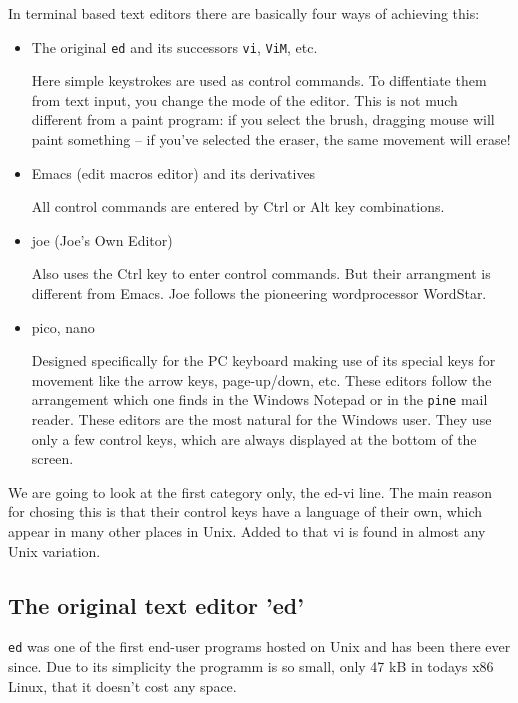 \documentclass[11pt,a4paper,twoside]{article}
\begin{document}
In terminal based text editors there are basically four ways of 
achieving this:

\begin{itemize}
\item The original \texttt{ed} and its successors \texttt{vi}, \texttt{ViM},
etc.

Here simple keystrokes are used as control commands. To diffentiate
them from text input, you change the mode of the editor. This is not
much different from a paint program: if you select the brush, dragging
mouse will paint something -- if you've selected the eraser, the same
movement will erase!

\item Emacs (edit macros editor) and its derivatives

All control commands are entered by Ctrl or Alt key combinations. 


\item joe (Joe's Own Editor)

Also uses the Ctrl key to enter control commands. But their arrangment
is different from Emacs. Joe follows the pioneering wordprocessor WordStar.

\item pico, nano

Designed specifically for the PC keyboard making use of its special
keys for movement like the arrow keys, page-up/down, etc. These editors
follow the arrangement which one finds in the Windows Notepad or in the
\texttt{pine} mail reader. These editors are the most natural for the 
Windows user. They use only a few control keys, which are always 
displayed at the bottom of the screen. 

\end{itemize}

We are going to look at the first category only, the ed-vi line.  The 
main reason for chosing this is that their control keys have a language 
of their own, which appear in many other places in Unix.  Added to that 
vi is found in almost any Unix variation.

\subsection{The original text editor 'ed'}

\texttt{ed} was one of the first end-user programs hosted on Unix
and has been there ever since. Due to its simplicity the programm
is so small, only 47 kB in todays x86 Linux, that it doesn't cost any
space.
\end{document}
